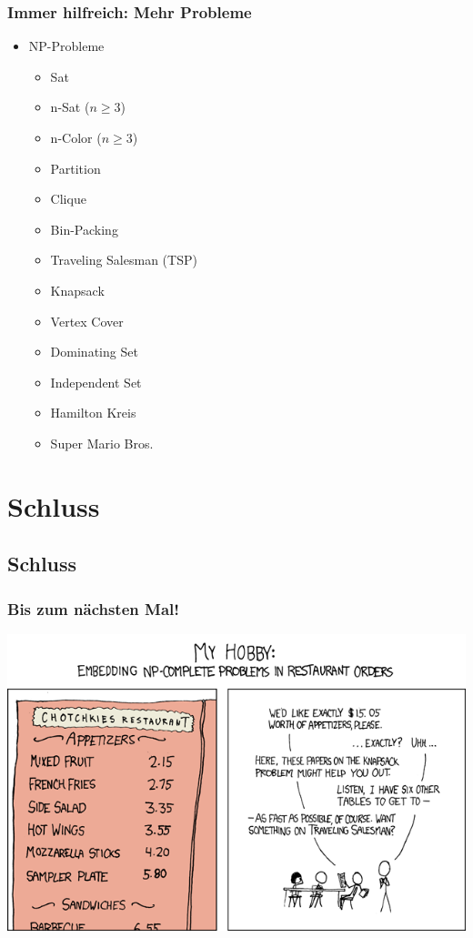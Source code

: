 \begin{frame}
	\frametitle{Immer hilfreich: Mehr Probleme}
	\begin{itemize}
		\item NP-Probleme
		\begin{itemize}
			\item Sat
			\item n-Sat ($n \geq 3$)
			\item n-Color ($n \geq 3$)
			\item Partition
			\item Clique
			\item Bin-Packing
			\item Traveling Salesman (TSP)
			\item Knapsack
			\item Vertex Cover
			\item Dominating Set
			\item Independent Set
			\item Hamilton Kreis
			\item Super Mario Bros.
		\end{itemize}
	\end{itemize}
\end{frame}
\section{Schluss}
\subsection{Schluss}
\begin{frame}
\frametitle{Bis zum nächsten Mal!}
\begin{center}
	\includegraphics[scale=5.2]{images/287_np_complete.png}
\end{center}
\end{frame}

